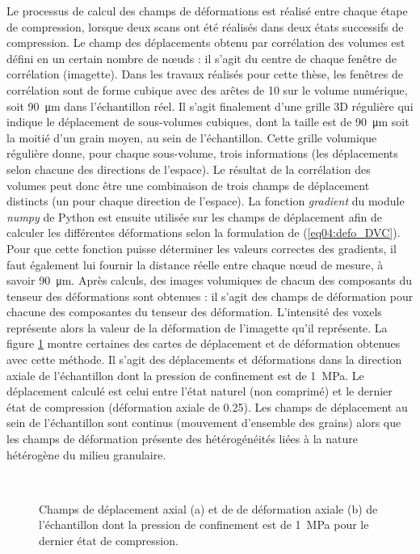 		Le processus de calcul des champs de déformations est réalisé entre chaque étape de compression, lorsque deux scans ont été réalisés dans deux états successifs de compression. Le champ des déplacements obtenu par corrélation des volumes est défini en un certain nombre de n\oe{}uds : il s'agit du centre de chaque fenêtre de corrélation (imagette). Dans les travaux réalisés pour cette thèse, les fenêtres de corrélation sont de forme cubique avec des arêtes de \SI{10}{\voxel} sur le volume numérique, soit \SI{90}{\micro\meter} dans l'échantillon réel. Il s'agit finalement d'une grille 3D régulière qui indique le déplacement de sous-volumes cubiques, dont la taille est de \SI{90}{\micro\meter} soit la moitié d'un grain moyen, au sein de l'échantillon. Cette grille volumique régulière donne, pour chaque sous-volume, trois informations (les déplacements selon chacune des directions de l'espace). Le résultat de la corrélation des volumes peut donc être une combinaison de trois champs de déplacement distincts (un pour chaque direction de l'espace). La fonction \emph{gradient} du module \emph{numpy} de Python est ensuite utilisée sur les champs de déplacement afin de calculer les différentes déformations selon la formulation de (\ref{eq04:defo_DVC}). Pour que cette fonction puisse déterminer les valeurs correctes des gradients, il faut également lui fournir la distance réelle entre chaque n\oe{}ud de mesure, à savoir \SI{90}{\micro\meter}. Après calculs, des images volumiques de chacun des composants du tenseur des déformations sont obtenues : il s'agit des champs de déformation pour chacune des composantes du tenseur des déformation. L'intensité des voxels représente alors la valeur de la déformation de l'imagette qu'il représente. La figure \ref{fig04:champ_deplacement_deformation} montre certaines des cartes de déplacement et de déformation obtenues avec cette méthode. Il s'agit des déplacements et déformations dans la direction axiale de l'échantillon dont la pression de confinement est de \SI{1}{\mega\pascal}. Le déplacement calculé est celui entre l'état naturel (non comprimé) et le dernier état de compression (déformation axiale de \num{0.25}). Les champs de déplacement au sein de l'échantillon sont continus (mouvement d'ensemble des grains) alors que les champs de déformation présente des hétérogénéités liées à la nature hétérogène du milieu granulaire.
		\begin{figure}\centering
			~\hfill
			\hfill
			\hfill~
			\caption{\label{fig04:champ_deplacement_deformation}Champs de déplacement axial (a) et de de déformation axiale (b) de l'échantillon dont la pression de confinement est de \SI{1}{\mega\pascal} pour le dernier état de compression.}
		\end{figure}

